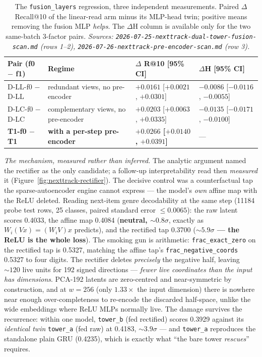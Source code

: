 \documentclass[11pt]{article}
\newcommand{\best}[1]{\textbf{#1}}
\begin{document}
\begin{table}[ht]
  \centering
  \caption{The \texttt{fusion\_layers} regression, three independent
  measurements. Paired $\Delta$ Recall@10 of the linear-read arm minus its
  MLP-head twin; positive means removing the fusion MLP \emph{helps}. The
  $\Delta$H column is available only for the two same-batch 3-factor pairs.
  \emph{Sources: \texttt{2026-07-25-nexttrack-dual-tower-fusion-scan.md} (rows
  1--2), \texttt{2026-07-26-nexttrack-pre-encoder-scan.md} (row 3).}}
  \label{tab:nexttrack-fusion-depth}
  {\scriptsize\setlength{\tabcolsep}{4pt}\begin{tabular}{llll}
    \toprule
    Pair (f0 $-$ f1) & Regime & $\Delta$ R@10 [95\% CI] & $\Delta$H [95\% CI] \\
    \midrule
    D-LL-f0 $-$ D-LL & redundant views, no pre-encoder & $+0.0161$ [$+0.0021$, $+0.0301$] & $-0.0086$ [$-0.0116$, $-0.0055$] \\
    D-LC-f0 $-$ D-LC & complementary views, no pre-encoder & $+0.0203$ [$+0.0063$, $+0.0335$] & $-0.0135$ [$-0.0171$, $-0.0100$] \\
    \best{T1-f0 $-$ T1} & \best{with a per-step pre-encoder} & \best{$+0.0266$ [$+0.0140$, $+0.0391$]} & --- \\
    \bottomrule
  \end{tabular}}
\end{table}

\emph{The mechanism, measured rather than inferred.} The analytic argument named
the rectifier as the only candidate; a follow-up interpretability read then
\emph{measured} it (Figure~\ref{fig:nexttrack-rectifier}). The decisive control
was a counterfactual tap the sparse-autoencoder engine cannot express --- the
model's \emph{own} affine map with the ReLU deleted. Reading next-item genre
decodability at the same step (\num{11184} probe test rows, 25 classes, paired
standard error $\le\num{0.0065}$): the raw latent scores \num{0.4033}, the
affine map \num{0.4084} (\textbf{neutral, ${\sim}0.8\sigma$}, exactly as
$W_i(Vx)=(W_iV)x$ predicts), and the rectified tap \num{0.3700}
(\textbf{${\sim}5.9\sigma$ --- the ReLU is the whole loss}). The smoking gun is
arithmetic: \texttt{frac\_exact\_zero} on the rectified tap is \num{0.5327},
matching the affine tap's \texttt{frac\_negative\_coords} \num{0.5327} to four
digits. The rectifier deletes \emph{precisely} the negative half, leaving
${\sim}120$ live units for 192 signed directions --- \emph{fewer live coordinates
than the input has dimensions}. PCA-192 latents are zero-centred and
near-symmetric by construction, and at $w=256$ (only $1.33\times$ the input
dimension) there is nowhere near enough over-completeness to re-encode the
discarded half-space, unlike the wide embeddings where ReLU MLPs normally live.
The damage survives the recurrence: within one model, \texttt{tower\_b} (fed
rectified) scores \num{0.3929} against its \emph{identical twin}
\texttt{tower\_a} (fed raw) at \num{0.4183}, ${\sim}3.9\sigma$ --- and
\texttt{tower\_a} reproduces the standalone plain GRU (\num{0.4235}), which is
exactly what ``the bare tower \emph{rescues}'' requires.
\end{document}
